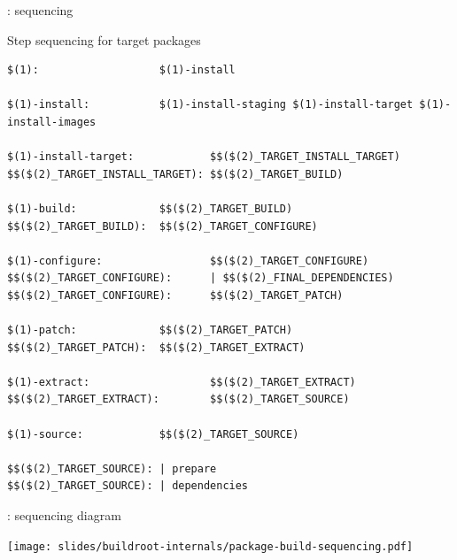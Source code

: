 \begin{frame}[fragile]{: sequencing}

\begin{block}{Step sequencing for target packages}
\begin{verbatim}
$(1):                   $(1)-install

$(1)-install:           $(1)-install-staging $(1)-install-target $(1)-install-images

$(1)-install-target:            $$($(2)_TARGET_INSTALL_TARGET)
$$($(2)_TARGET_INSTALL_TARGET): $$($(2)_TARGET_BUILD)

$(1)-build:             $$($(2)_TARGET_BUILD)
$$($(2)_TARGET_BUILD):  $$($(2)_TARGET_CONFIGURE)

$(1)-configure:                 $$($(2)_TARGET_CONFIGURE)
$$($(2)_TARGET_CONFIGURE):      | $$($(2)_FINAL_DEPENDENCIES)
$$($(2)_TARGET_CONFIGURE):      $$($(2)_TARGET_PATCH)

$(1)-patch:             $$($(2)_TARGET_PATCH)
$$($(2)_TARGET_PATCH):  $$($(2)_TARGET_EXTRACT)

$(1)-extract:                   $$($(2)_TARGET_EXTRACT)
$$($(2)_TARGET_EXTRACT):        $$($(2)_TARGET_SOURCE)

$(1)-source:            $$($(2)_TARGET_SOURCE)

$$($(2)_TARGET_SOURCE): | prepare
$$($(2)_TARGET_SOURCE): | dependencies
\end{verbatim}
\end{block}

\end{frame}

\begin{frame}{: sequencing diagram}

\begin{center}
  \texttt{[image: slides/buildroot-internals/package-build-sequencing.pdf]}
\end{center}

\end{frame}

